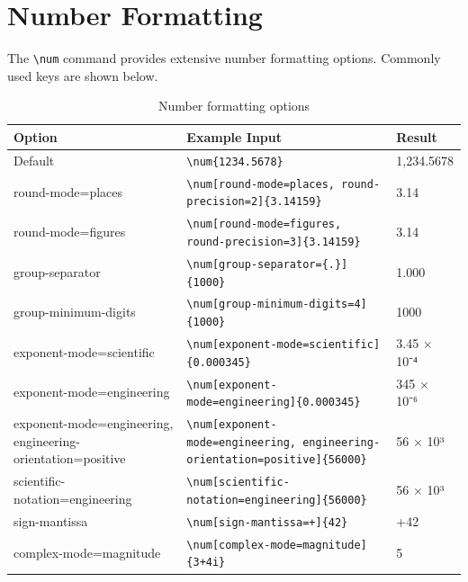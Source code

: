 \section{Number Formatting}

The \verb|\num| command provides extensive number formatting options.
Commonly used keys are shown below.

\begin{table}[htbp]
    \centering
    \caption{Number formatting options}
    \label{tab:num-options}
    \begin{tabular}{@{} l l p{5.5cm} @{}}
        \toprule
        \textbf{Option} & \textbf{Example Input} &
        \textbf{Result} \\
        \midrule
        Default & \texttt{\textbackslash{}num\{1234.5678\}} & 1,234.5678 \\[3pt]
        \textsf{round-mode=places} &
            \texttt{\textbackslash{}num[round-mode=places, round-precision=2]\{3.14159\}} &
            3.14 \\[3pt]
        \textsf{round-mode=figures} &
            \texttt{\textbackslash{}num[round-mode=figures, round-precision=3]\{3.14159\}} &
            3.14 \\[3pt]
        \textsf{group-separator} &
            \texttt{\textbackslash{}num[group-separator=\{.\}]\{1000\}} & 1.000 \\[3pt]
        \textsf{group-minimum-digits} &
            \texttt{\textbackslash{}num[group-minimum-digits=4]\{1000\}} & 1000 \\[3pt]
        \textsf{exponent-mode=scientific} &
            \texttt{\textbackslash{}num[exponent-mode=scientific]\{0.000345\}} &
            3.45 × 10⁻⁴ \\[3pt]
        \textsf{exponent-mode=engineering} &
            \texttt{\textbackslash{}num[exponent-mode=engineering]\{0.000345\}} &
            345 × 10⁻⁶ \\[3pt]
        \textsf{exponent-mode=engineering,
            engineering-orientation=positive} &
            \texttt{\textbackslash{}num[exponent-mode=engineering,
                engineering-orientation=positive]\{56000\}} &
            56 × 10³ \\[3pt]
        \textsf{scientific-notation=engineering} &
            \texttt{\textbackslash{}num[scientific-notation=engineering]\{56000\}} &
            56 × 10³ \\[3pt]
        \textsf{sign-mantissa} &
            \texttt{\textbackslash{}num[sign-mantissa=+]\{42\}} & +42 \\[3pt]
        \textsf{complex-mode=magnitude} &
            \texttt{\textbackslash{}num[complex-mode=magnitude]\{3+4i\}} & 5 \\
        \bottomrule
    \end{tabular}
\end{table}

